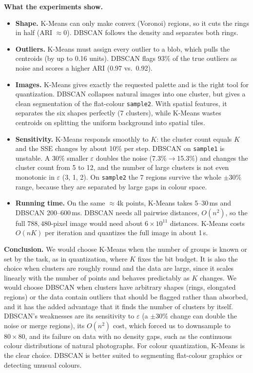 \documentclass[10.5pt]{article}
\begin{document}
\textbf{What the experiments show.}
\begin{itemize}
  \item \textbf{Shape.} K-Means can only make convex (Voronoi) regions, so it cuts the rings in half (ARI $\approx 0$).
        DBSCAN follows the density and separates both rings.
  \item \textbf{Outliers.} K-Means must assign every outlier to a blob, which pulls the centroids (by up to 0.16 units).
        DBSCAN flags 93\% of the true outliers as noise and scores a higher ARI (0.97 vs.\ 0.92).
  \item \textbf{Images.} K-Means gives exactly the requested palette and is the right tool for quantization. DBSCAN
        collapses natural images into one cluster, but gives a clean segmentation of the flat-colour \texttt{sample2}. With
        spatial features, it separates the six shapes perfectly (7 clusters), while K-Means wastes centroids on
        splitting the uniform background into spatial tiles.
  \item \textbf{Sensitivity.} K-Means responds smoothly to $K$: the cluster count equals $K$ and the SSE changes by
        about 10\% per step. DBSCAN on \texttt{sample1} is unstable. A 30\% smaller $\varepsilon$ doubles the noise
        (7.3\%$\to$15.3\%) and changes the cluster count from 5 to 12, and the number of large clusters is not even
        monotonic in $\varepsilon$ (3, 1, 2). On \texttt{sample2} the 7 regions survive the whole $\pm30\%$ range,
        because they are separated by large gaps in colour space.
  \item \textbf{Running time.} On the same $\approx$4k points, K-Means takes 5--30\,ms and DBSCAN 200--600\,ms.
        DBSCAN needs all pairwise distances, $O(n^2)$, so the full $788{,}480$-pixel image would need about
        $6\times10^{11}$ distances. K-Means costs $O(nK)$ per iteration and quantizes the full image in about 1\,s.
\end{itemize}

\textbf{Conclusion.} We would choose K-Means when the number of groups is known or set by the task, as in
quantization, where $K$ fixes the bit budget. It is also the choice when clusters are roughly round and the data
are large, since it scales linearly with the number of points and behaves predictably as $K$ changes. We would
choose DBSCAN when clusters have arbitrary shapes (rings, elongated regions) or the data contain outliers that
should be flagged rather than absorbed, and it has the added advantage that it finds the number of clusters by
itself. DBSCAN's weaknesses are its sensitivity to $\varepsilon$ (a $\pm30\%$ change can double the noise or merge
regions), its $O(n^2)$ cost, which forced us to downsample to $80\times80$, and its failure on data with no
density gaps, such as the continuous colour distributions of natural photographs. For colour quantization,
K-Means is the clear choice. DBSCAN is better suited to segmenting flat-colour graphics or detecting unusual
colours.
\end{document}
